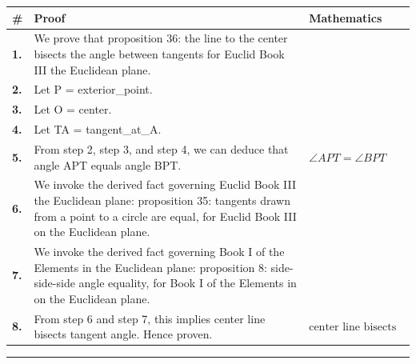 \documentclass[11pt]{article}
\theoremstyle{definition}
\begin{document}
\begin{tabular}{@{} >{\raggedright\arraybackslash}p{} >{\raggedright\arraybackslash}p{} >{\raggedleft\arraybackslash}p{} @{}}
\textbf{\#} & \textbf{Proof} & \textbf{Mathematics} \\
\midrule
\textbf{1.} & We prove that proposition 36: the line to the center bisects the angle between tangents for Euclid Book III the Euclidean plane. & \\[0.45em]
\textbf{2.} & Let P = exterior\_point. & \\[0.45em]
\textbf{3.} & Let O = center. & \\[0.45em]
\textbf{4.} & Let TA = tangent\_at\_A. & \\[0.45em]
\textbf{5.} & From step 2, step 3, and step 4, we can deduce that angle APT equals angle BPT. & $\displaystyle \angle APT = \angle BPT$ \\[0.45em]
\textbf{6.} & We invoke the derived fact governing Euclid Book III the Euclidean plane: proposition 35: tangents drawn from a point to a circle are equal, for Euclid Book III on the Euclidean plane. & \\[0.45em]
\textbf{7.} & We invoke the derived fact governing Book I of the Elements in the Euclidean plane: proposition 8: side-side-side angle equality, for Book I of the Elements in on the Euclidean plane. & \\[0.45em]
\textbf{8.} & From step 6 and step 7, this implies center line bisects tangent angle. Hence proven. & $\displaystyle \text{center line bisects tangent angle}$ \\[0.45em]
\bottomrule
\end{tabular}
\label{thm:Geometry-Euclid Book III-proposition_36_the_line_to_the_center_bisects_the_angle_between_tangents}
\par\medskip\hrule
\end{document}
